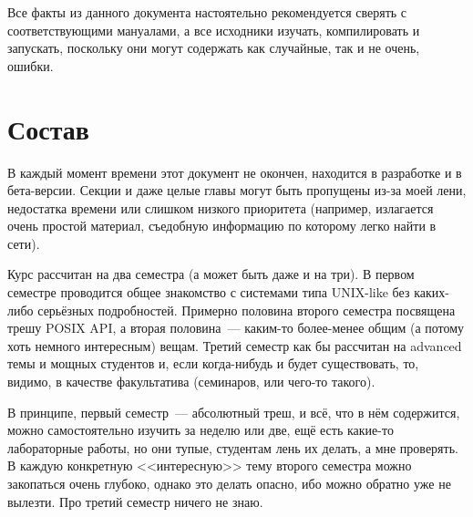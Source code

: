 Все факты из данного документа настоятельно рекомендуется сверять с соответствующими мануалами, а все исходники изучать, компилировать и запускать, поскольку они могут содержать как случайные, так и не очень, ошибки.

\section*{Состав}
В каждый момент времени этот документ не окончен, находится в разработке и в бета-версии.
Секции и даже целые главы могут быть пропущены из-за моей лени, недостатка времени или слишком низкого приоритета (например, излагается очень простой материал, съедобную информацию по которому легко найти в сети).

Курс рассчитан на два семестра (а может быть даже и на три).
В первом семестре проводится общее знакомство с системами типа UNIX-like без каких-либо серьёзных подробностей.
Примерно половина второго семестра посвящена трешу POSIX API, а вторая половина~--- каким-то более-менее общим (а потому хоть немного интересным) вещам.
Третий семестр как бы рассчитан на advanced темы и мощных студентов и, если когда-нибудь и будет существовать, то, видимо, в качестве факультатива (семинаров, или чего-то такого).

В принципе, первый семестр~--- абсолютный треш, и всё, что в нём содержится, можно самостоятельно изучить за неделю или две, ещё есть какие-то лабораторные работы, но они тупые, студентам лень их делать, а мне проверять.
В каждую конкретную <<интересную>> тему второго семестра можно закопаться очень глубоко, однако это делать опасно, ибо можно обратно уже не вылезти.
Про третий семестр ничего не знаю.
